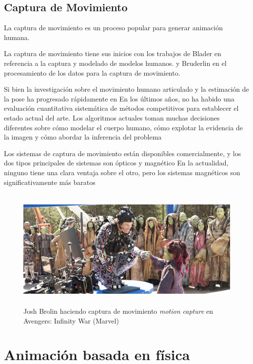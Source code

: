 \documentclass[a4paper,12pt]{report}
\begin{document}
 
\section{Captura de Movimiento}
 
La captura de movimiento es un proceso popular para generar animación humana.\cite{Bodenheimer}
 
La captura de movimiento tiene sus inicios con los trabajos de Blader\cite{blader1}\cite{blader2} en referencia a la captura y modelado de modelos humanos.
y Bruderlin\cite{bruderlin} en el procesamiento de los datos para la captura de movimiento.
 
 
Si bien la investigación sobre el movimiento humano articulado y la estimación de la pose ha progresado rápidamente en
En los últimos años, no ha habido una evaluación cuantitativa sistemática de métodos competitivos
para establecer el estado actual del arte. Los algoritmos actuales toman muchas decisiones diferentes sobre
cómo modelar el cuerpo humano, cómo explotar la evidencia de la imagen y cómo abordar la inferencia del
problema\cite{state_of_art}
 
 
Los sistemas de captura de movimiento están disponibles comercialmente, y los dos tipos principales de sistemas son ópticos
y magnético En la actualidad, ninguno tiene una clara ventaja sobre el otro, pero los sistemas magnéticos son significativamente más baratos\cite{Bodenheimer}
 
 
\begin{figure}[ht]
    \centering
    \includegraphics[height=6cm]{Imagenes/motion_capture}
    \caption{Josh Brolin haciendo captura de movimiento \textit{motion capture} en Avengers: Infinity War (Marvel)}
    \label{fig:motion_capture}
\end{figure}
 
 
\chapter{Animación basada en física}
 
\end{document}
